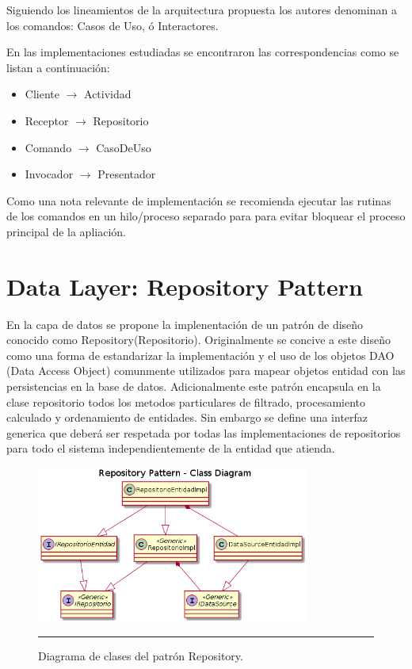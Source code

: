 Siguiendo los lineamientos de la arquitectura propuesta los autores denominan a los comandos: Casos de Uso, ó Interactores.

En las implementaciones estudiadas se encontraron las correspondencias como se listan a continuación:
\begin{itemize}
	\item Cliente $\rightarrow$ Actividad
	\item Receptor $\rightarrow$ Repositorio
	\item Comando $\rightarrow$ CasoDeUso
	\item Invocador $\rightarrow$ Presentador
\end{itemize}

Como una nota relevante de implementación se recomienda ejecutar las rutinas de los comandos en un hilo/proceso separado para para evitar bloquear el proceso principal de la apliación.



\section{Data Layer: Repository Pattern}
En la capa de datos se propone la implenentación de un patrón de diseño conocido como Repository(Repositorio). 
Originalmente se concive a este diseño como una forma de estandarizar la implementación y el uso de los objetos DAO (Data Access Object) comunmente utilizados para mapear objetos entidad con las persistencias en la base de datos.
Adicionalmente este patrón encapsula en la clase repositorio todos los metodos particulares de filtrado, procesamiento calculado y ordenamiento de entidades.
Sin embargo se define una interfaz generica que deberá ser respetada por todas las implementaciones de repositorios para todo el sistema independientemente de la entidad que atienda.

\begin{figure}[htbp]
	\centering
	\includegraphics[width=0.8\textwidth]{Figures/uml_clases_repository.png}
	\rule{35em}{1pt}
	\caption[Repository Pattern Class Diagram]{Diagrama de clases del patrón Repository.}
	\label{fig:uml_clases_repository}
\end{figure}

